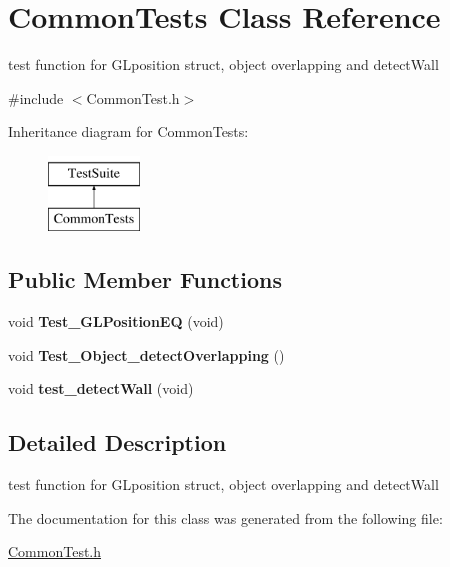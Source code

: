 \hypertarget{classCommonTests}{\section{Common\-Tests Class Reference}
\label{classCommonTests}
}


test function for G\-Lposition struct, object overlapping and detect\-Wall  




{\ttfamily \#include $<$Common\-Test.\-h$>$}

Inheritance diagram for Common\-Tests\-:\begin{figure}[H]
\begin{center}
\leavevmode
\includegraphics[height=2.000000cm]{classCommonTests}
\end{center}
\end{figure}
\subsection*{Public Member Functions}
\begin{DoxyCompactItemize}
\item 
\hypertarget{classCommonTests_a7b4e7469ca8ac289b9dc4ec52a454e0b}{void {\bfseries Test\-\_\-\-G\-L\-Position\-E\-Q} (void)}\label{classCommonTests_a7b4e7469ca8ac289b9dc4ec52a454e0b}

\item 
\hypertarget{classCommonTests_ab3fd4ebe7420eb8d9aa442c3754ad024}{void {\bfseries Test\-\_\-\-Object\-\_\-detect\-Overlapping} ()}\label{classCommonTests_ab3fd4ebe7420eb8d9aa442c3754ad024}

\item 
\hypertarget{classCommonTests_ac02de5286f53e2ab33de69298db6e6ea}{void {\bfseries test\-\_\-detect\-Wall} (void)}\label{classCommonTests_ac02de5286f53e2ab33de69298db6e6ea}

\end{DoxyCompactItemize}


\subsection{Detailed Description}
test function for G\-Lposition struct, object overlapping and detect\-Wall 

The documentation for this class was generated from the following file\-:\begin{DoxyCompactItemize}
\item 
\hyperlink{CommonTest_8h}{Common\-Test.\-h}\end{DoxyCompactItemize}
